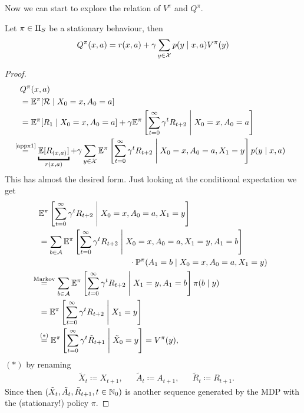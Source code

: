 Now we can start to explore the relation of \(V^\pi\) and \(Q^\pi\).

\begin{prop}\label{expand Q^pi} Let \(\pi\in\Pi_S\) be a stationary behaviour, then
	\[Q^\pi(x,a)=r(x,a)+\gamma\sum_{y\in\mathcal{X}}p(y\mid x,a)V^\pi(y)\]
\end{prop}

\begin{proof}\leavevmode
\begin{align*}
&Q^\pi(x,a) \\
&= \E^\pi[\cR\mid X_0=x, A_0=a]\\
&=\E^\pi[R_1\mid X_0=x,A_0=a]
+\gamma\E^\pi\left[\sum_{t=0}^\infty\gamma^t R_{t+2}\;\middle|\; X_0=x,A_0=a\right]\\
&\lxeq{\text{\ref{appx1}}} \underbracket{\E[R_{(x,a)}]}_{r(x,a)} 
 + \gamma \sum_{y\in\cX}\E^\pi\left[\sum_{t=0}^\infty\gamma^t R_{t+2} \;\middle|\; X_0=x,A_0=a, X_1=y\right]p(y\mid x, a)\\
\end{align*}
This has almost the desired form. Just looking at the conditional expectation we get
\begin{align*}
	&\E^\pi\left[\sum_{t=0}^\infty\gamma^t R_{t+2} \;\middle|\; X_0=x,A_0=a, X_1=y\right]\\
	&=\sum_{b\in\cA}
	\begin{aligned}[t]
	&\E^\pi\left[\sum_{t=0}^\infty\gamma^t R_{t+2} 
	\;\middle|\; X_0=x,A_0=a, X_1=y,A_1=b \right]\\
	&\qquad\qquad\qquad\qquad\cdot \Pr^\pi(A_1=b \mid X_0=x,A_0=a, X_1=y) 
	\end{aligned}
	\\
	&\lxeq{\text{Markov}} 
	\sum_{b\in\cA}\E^\pi\left[\sum_{t=0}^\infty\gamma^t R_{t+2} \;\middle|\; X_1=y,A_1=b \right]
	\pi(b\mid y)\\
	&= \E^\pi\left[\sum_{t=0}^\infty\gamma^t R_{t+2}\;\middle|\; X_1=y \right] \\
 	&\lxeq{(*)} \E^\pi\left[\sum_{t=0}^\infty\gamma^t \tilde{R}_{t+1}\;\middle|\; \tilde{X}_0=y \right]=V^\pi(y),
\end{align*}
\((*)\) by renaming 
\begin{align*}
	&\tilde{X}_{t}\coloneqq X_{t+1}, && \tilde{A}_t\coloneqq A_{t+1},
	&&\tilde{R}_{t}\coloneqq R_{t+1}.
\end{align*}
Since then \((\tilde{X}_t,\tilde{A}_t,\tilde{R}_{t+1}, t\in\mathbb{N}_0)\) is another sequence generated by the MDP with the (stationary!) policy \(\pi\).
\end{proof}

